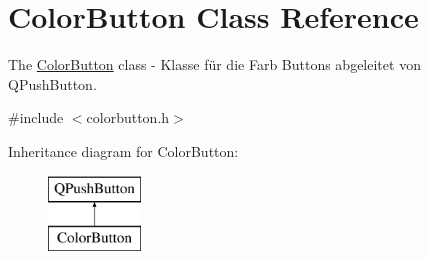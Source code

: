 \hypertarget{class_color_button}{}\section{Color\+Button Class Reference}
\label{class_color_button}


The \hyperlink{class_color_button}{Color\+Button} class -\/ Klasse für die Farb Buttons abgeleitet von Q\+Push\+Button.  




{\ttfamily \#include $<$colorbutton.\+h$>$}

Inheritance diagram for Color\+Button\+:\begin{figure}[H]
\begin{center}
\leavevmode
\includegraphics[height=2.000000cm]{class_color_button}
\end{center}
\end{figure}

